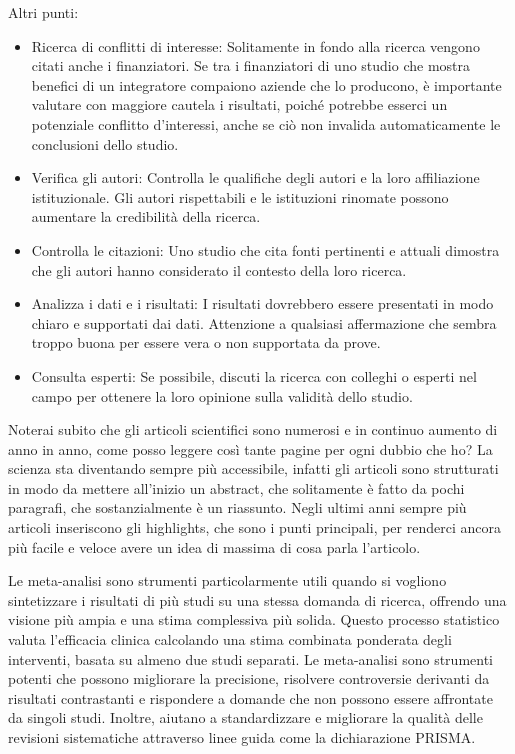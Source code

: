 \documentclass[12pt]{book} %
\begin{document}
Altri punti:
\begin{itemize}
\item Ricerca di conflitti di interesse: Solitamente in fondo alla ricerca vengono citati anche i finanziatori. Se tra i finanziatori di uno studio che mostra benefici di un integratore compaiono aziende che lo producono, è importante valutare con maggiore cautela i risultati, poiché potrebbe esserci un potenziale conflitto d’interessi, anche se ciò non invalida automaticamente le conclusioni dello studio.
\item Verifica gli autori: Controlla le qualifiche degli autori e la loro affiliazione istituzionale. Gli autori
rispettabili e le istituzioni rinomate possono aumentare la credibilità della ricerca.
\item Controlla le citazioni: Uno studio che cita fonti pertinenti e attuali dimostra che gli autori hanno considerato
il contesto della loro ricerca.
\item Analizza i dati e i risultati: I risultati dovrebbero essere presentati in modo chiaro e supportati dai dati.
Attenzione a qualsiasi affermazione che sembra troppo buona per essere vera o non supportata da prove.
\item Consulta esperti: Se possibile, discuti la ricerca con colleghi o esperti nel campo per ottenere la loro opinione
sulla validità dello studio.
\end{itemize}

Noterai subito che gli articoli scientifici sono numerosi e in continuo aumento di anno in anno, come posso leggere così
tante pagine per ogni dubbio che ho? La scienza sta diventando sempre più accessibile, infatti gli articoli sono
strutturati in modo da mettere all'inizio un abstract, che solitamente è fatto da pochi paragrafi,
che sostanzialmente è un riassunto. Negli ultimi anni sempre più articoli inseriscono gli highlights, che sono i punti
principali, per renderci ancora più facile e veloce avere un idea di massima di cosa parla
l'articolo.

Le meta-analisi sono strumenti particolarmente utili quando si vogliono sintetizzare i risultati di più studi su una stessa domanda di ricerca, offrendo una visione più ampia e una stima complessiva più solida. Questo processo statistico valuta
l'efficacia clinica calcolando una stima combinata ponderata degli interventi, basata su almeno
due studi separati. Le meta-analisi sono strumenti potenti che possono migliorare la precisione, risolvere controversie
derivanti da risultati contrastanti e rispondere a domande che non possono essere affrontate da singoli studi. Inoltre,
aiutano a standardizzare e migliorare la qualità delle revisioni sistematiche attraverso linee guida come la
dichiarazione PRISMA.
\end{document}
